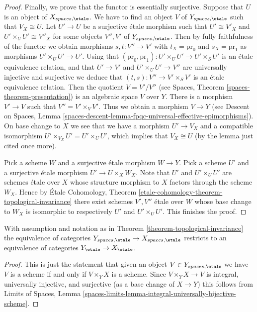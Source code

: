 \begin{proof}
\medskip\noindent
Finally, we prove that the functor is essentially surjective.
Suppose that $U$ is an object of $X_{spaces, \etale}$.
We have to find an object $V$ of $Y_{spaces, \etale}$
such that $V_X \cong U$. Let $U' \to U$ be a surjective \'etale morphism
such that $U' \cong V'_X$ and $U' \times_U U' \cong V''_X$
for some objects $V'', V'$ of $Y_{spaces, \etale}$.
Then by fully faithfulness of the functor we obtain morphisms
$s, t : V'' \to V'$ with $t_X = \text{pr}_0$ and $s_X = \text{pr}_1$
as morphisms $U' \times_U U' \to U'$. Using that
$(\text{pr}_0, \text{pr}_1) : U' \times_U U' \to U' \times_S U'$
is an \'etale equivalence relation, and that $U' \to V'$ and
$U' \times_U U' \to V''$ are universally injective and surjective
we deduce that
$(t, s) : V'' \to V' \times_S V'$ is an \'etale equivalence relation.
Then the quotient $V = V'/V''$ (see
Spaces, Theorem \ref{spaces-theorem-presentation})
is an algebraic space $V$ over $Y$. There is a morphism
$V' \to V$ such that $V'' = V' \times_V V'$. Thus we obtain a morphism
$V \to Y$ (see
Descent on Spaces, Lemma
\ref{spaces-descent-lemma-fpqc-universal-effective-epimorphisms}).
On base change to $X$ we see that we have a morphism $U' \to V_X$
and a compatible isomorphism $U' \times_{V_X} U' = U' \times_U U'$, which
implies that $V_X \cong U$ (by the lemma just cited once more).

\medskip\noindent
Pick a scheme $W$ and a surjective \'etale morphism $W \to Y$.
Pick a scheme $U'$ and a surjective \'etale morphism $U' \to U \times_X W_X$.
Note that $U'$ and $U' \times_U U'$ are schemes \'etale over $X$ whose
structure morphism to $X$ factors through the scheme $W_X$.
Hence by
\'Etale Cohomology,
Theorem \ref{etale-cohomology-theorem-topological-invariance}
there exist schemes $V', V''$ \'etale over $W$ whose base change to
$W_X$ is isomorphic to respectively $U'$ and $U' \times_U U'$.
This finishes the proof.
\end{proof}

\begin{lemma}
\label{lemma-topological-invariance}
With assumption and notation as in
Theorem \ref{theorem-topological-invariance}
the equivalence of categories
$Y_{spaces, \etale} \to X_{spaces, \etale}$
restricts to an equivalence of categories
$Y_\etale \to X_\etale$.
\end{lemma}

\begin{proof}
This is just the statement that given an object
$V \in Y_{spaces, \etale}$ we have $V$ is a scheme if and
only if $V \times_Y X$ is a scheme. Since $V \times_Y X \to V$
is integral, universally injective, and surjective (as a base
change of $X \to Y$) this
follows from Limits of Spaces, Lemma
\ref{spaces-limits-lemma-integral-universally-bijective-scheme}.
\end{proof}

